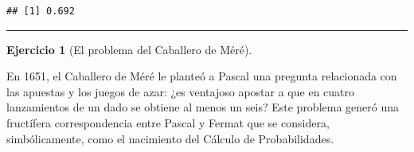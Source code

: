 \documentclass[
]{book}
\theoremstyle{break}
\theoremstyle{definition}
\theoremstyle{definition}
\theoremstyle{definition}
\newtheorem{exercise}{Ejercicio}[chapter]
\theoremstyle{definition}
\theoremstyle{remark}
\begin{document}
\begin{verbatim}
## [1] 0.692
\end{verbatim}

\begin{center}\rule{0.5\linewidth}{0.5pt}\end{center}

\begin{exercise}[El problema del Caballero de Méré]
\protect\hypertarget{exr:mere}{}{\label{exr:mere} {} }
\end{exercise}
En 1651, el Caballero de Méré le planteó a Pascal una pregunta
relacionada con las apuestas y los juegos de azar: ¿es ventajoso
apostar a que en cuatro lanzamientos de un dado se obtiene al menos
un seis? Este problema generó una fructífera correspondencia entre
Pascal y Fermat que se considera, simbólicamente, como el nacimiento
del Cálculo de Probabilidades.
\end{document}
